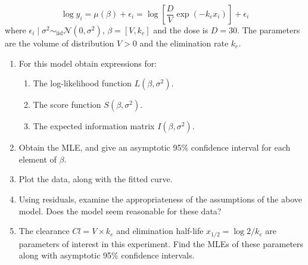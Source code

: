 \documentclass[letterpaper,11pt]{article}
\begin{document}
\begin{enumerate}
  \begin{equation}
    \log y_i = \mu\left(\beta\right) + \epsilon_i =
    \log\left[
      \frac{D}{V}\exp\left(-k_e x_i\right)
    \right]
    + \epsilon_i
    \label{eqn:p3_model}
  \end{equation}
  where
  $\epsilon_i \mid \sigma^2 \sim_\mathrm{iid}
  \mathcal{N}\left(0,\sigma^2\right)$, $\beta = \left[V,k_e\right]$ and the dose
  is $D = 30$. The parameters are the volume of distribution $V > 0$ and the
  elimination rate $k_e$.
  \begin{enumerate}
  \item For this model obtain expressions for:
    \begin{enumerate}
    \item The log-likelihood function $L\left(\beta, \sigma^2\right)$.
    \item The score function $S\left(\beta, \sigma^2\right)$.
    \item The expected information matrix $I\left(\beta, \sigma^2\right)$.
    \end{enumerate}
  \item Obtain the MLE, and give an asymptotic 95\% confidence interval for each
    element of $\beta$.
  \item Plot the data, along with the fitted curve.
  \item Using residuals, examine the appropriateness of the assumptions of the
    above model. Does the model seem reasonable for these data?
  \item The clearance $Cl = V \times k_e$ and elimination half-life
    $x_{1/2} = \log 2/k_e$ are parameters of interest in this experiment. Find
    the MLEs of these parameters along with asymptotic 95\% confidence intervals.
  \end{enumerate}
\end{enumerate}
\end{document}
